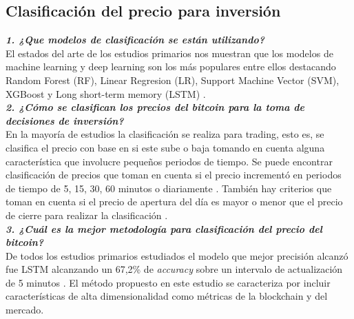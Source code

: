 \subsection{Clasificación del precio para inversión}

\textbf{\textit{1. ¿Que modelos de clasificación se están utilizando?}}\\
El estados del arte de los estudios primarios nos muestran que los modelos de machine learning y deep learning son los más populares entre ellos destacando Random Forest (RF), Linear Regresion (LR), Support Machine Vector (SVM), XGBoost y Long short-term memory (LSTM) \parencite{ibrahimPredictingMarketMovement2021, jaquartShorttermBitcoinMarket2021,chenBitcoinPricePrediction2020,akyildirimPredictionCryptocurrencyReturns2021,pintelasInvestigatingProblemCryptocurrency2020}.\\

\textbf{\textit{2. ¿Cómo se clasifican los precios del bitcoin para la toma de decisiones de inversión?}}\\
En la mayoría de estudios la clasificación se realiza para trading, esto es, se clasifica el precio con base en si este sube o baja tomando en cuenta alguna característica que involucre pequeños periodos de tiempo. Se puede encontrar clasificación de precios que toman en cuenta si el precio incrementó en periodos de tiempo de 5, 15, 30, 60 minutos o diariamente \parencite{ibrahimPredictingMarketMovement2021, jaquartShorttermBitcoinMarket2021,chenBitcoinPricePrediction2020,pintelasInvestigatingProblemCryptocurrency2020}. También hay criterios que toman en cuenta si el precio de apertura del día es mayor o menor que el precio de cierre para realizar la clasificación \parencite{akyildirimPredictionCryptocurrencyReturns2021}.\\

\textbf{\textit{3. ¿Cuál es la mejor metodología para clasificación del precio del bitcoin?}}\\
De todos los estudios primarios estudiados el modelo que mejor precisión alcanzó fue LSTM alcanzando un 67,2\% de \textit{accuracy} sobre un intervalo de actualización de 5 minutos \parencite{chenBitcoinPricePrediction2020}. El método propuesto en este estudio se caracteriza por incluir características de alta dimensionalidad como métricas de la blockchain y del mercado.\\






